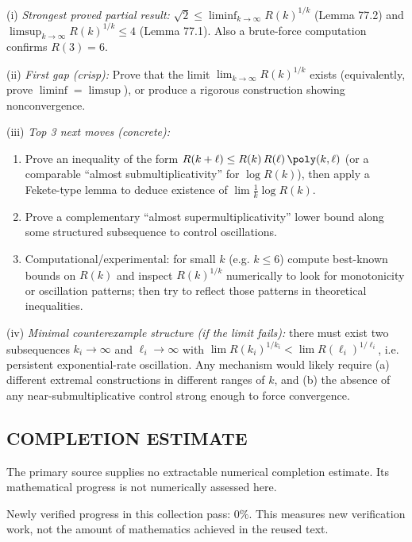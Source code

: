 (i) \emph{Strongest proved partial result:} $\sqrt2\le \liminf_{k\to\infty}R(k)^{1/k}$ (Lemma 77.2) and $\limsup_{k\to\infty}R(k)^{1/k}\le 4$ (Lemma 77.1). Also a brute-force computation confirms $R(3)=6$.

(ii) \emph{First gap (crisp):} Prove that the limit $\lim_{k\to\infty}R(k)^{1/k}$ exists (equivalently, prove $\liminf=\limsup$), or produce a rigorous construction showing nonconvergence.

(iii) \emph{Top 3 next moves (concrete):}
\begin{enumerate}
\item Prove an inequality of the form $R(k+\ell)\le R(k)\,R(\ell)\,\poly(k,\ell)$ (or a comparable ``almost submultiplicativity'' for $\log R(k)$), then apply a Fekete-type lemma to deduce existence of $\lim \frac1k\log R(k)$.
\item Prove a complementary ``almost supermultiplicativity'' lower bound along some structured subsequence to control oscillations.
\item Computational/experimental: for small $k$ (e.g. $k\le 6$) compute best-known bounds on $R(k)$ and inspect $R(k)^{1/k}$ numerically to look for monotonicity or oscillation patterns; then try to reflect those patterns in theoretical inequalities.
\end{enumerate}

(iv) \emph{Minimal counterexample structure (if the limit fails):} there must exist two subsequences $k_i\to\infty$ and $\ell_i\to\infty$ with $\lim R(k_i)^{1/k_i}<\lim R(\ell_i)^{1/\ell_i}$, i.e. persistent exponential-rate oscillation. Any mechanism would likely require (a) different extremal constructions in different ranges of $k$, and (b) the absence of any near-submultiplicative control strong enough to force convergence.




\subsection*{COMPLETION ESTIMATE}
The primary source supplies no extractable numerical completion estimate. Its mathematical progress is not numerically assessed here.

Newly verified progress in this collection pass: $0\%$. This measures new verification work, not the amount of mathematics achieved in the reused text.
